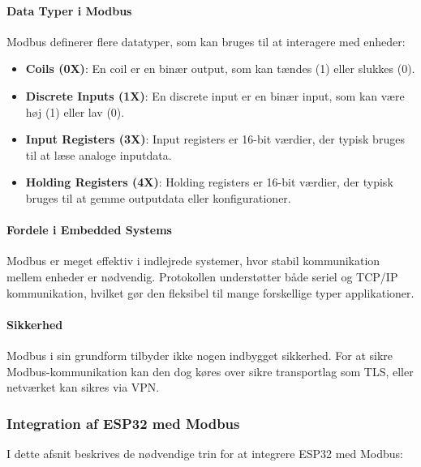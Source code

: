 \paragraph{Data Typer i Modbus}
Modbus definerer flere datatyper, som kan bruges til at interagere med enheder:
\begin{itemize}
	\item \textbf{Coils (0X)}: En coil er en binær output, som kan tændes (1) eller slukkes (0).
	\item \textbf{Discrete Inputs (1X)}: En discrete input er en binær input, som kan være høj (1) eller lav (0).
	\item \textbf{Input Registers (3X)}: Input registers er 16-bit værdier, der typisk bruges til at læse analoge inputdata.
	\item \textbf{Holding Registers (4X)}: Holding registers er 16-bit værdier, der typisk bruges til at gemme outputdata eller konfigurationer.
\end{itemize}

\paragraph{Fordele i Embedded Systems}
Modbus er meget effektiv i indlejrede systemer, hvor stabil kommunikation mellem enheder er nødvendig. Protokollen understøtter både seriel og TCP/IP kommunikation, hvilket gør den fleksibel til mange forskellige typer applikationer.

\paragraph{Sikkerhed}
Modbus i sin grundform tilbyder ikke nogen indbygget sikkerhed. For at sikre Modbus-kommunikation kan den dog køres over sikre transportlag som TLS, eller netværket kan sikres via VPN.

\subsubsection*{Integration af ESP32 med Modbus}
I dette afsnit beskrives de nødvendige trin for at integrere ESP32 med Modbus:

